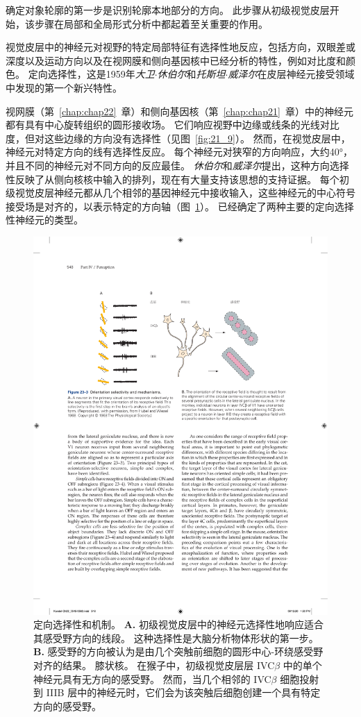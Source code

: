 确定对象轮廓的第一步是识别轮廓本地部分的方向。
此步骤从初级视觉皮层开始，该步骤在局部和全局形式分析中都起着至关重要的作用。


视觉皮层中的神经元对视野的特定局部特征有选择性地反应，包括方向，双眼差或深度以及运动方向以及在视网膜和侧向基因核中已经分析的特性，例如对比度和颜色。 
定向选择性，这是1959年\textit{大卫$\cdot$休伯尔}和\textit{托斯坦$\cdot$威泽尔}在皮层神经元接受领域中发现的第一个新兴特性。


视网膜（第~\ref{chap:chap22}~章）和侧向基因核（第~\ref{chap:chap21}~章）中的神经元都有具有中心旋转组织的圆形接收场。
它们响应视野中边缘或线条的光线对比度，但对这些边缘的方向没有选择性（见图~\ref{fig:21_9}）。
然而，在视觉皮层中，神经元对特定方向的线有选择性反应。
每个神经元对狭窄的方向响应，大约40°，并且不同的神经元对不同方向的反应最佳。
\textit{休伯尔}和\textit{威泽尔}提出，这种方向选择性反映了从侧向核核中输入的排列，现在有大量支持该思想的支持证据。
每个初级视觉皮层神经元都从几个相邻的基因神经元中接收输入，这些神经元的中心符号接受场是对齐的，以表示特定的方向轴（图~\ref{fig:23_3}）。
已经确定了两种主要的定向选择性神经元的类型。


\begin{figure}[htbp]
	\centering
	\includegraphics[width=0.9\linewidth]{chap23/fig_23_3}
	\caption{定向选择性和机制。
		\textbf{A.} 初级视觉皮层中的神经元选择性地响应适合其感受野方向的线段。
		这种选择性是大脑分析物体形状的第一步\cite{hubel1968receptive}。
		\textbf{B.} 感受野的方向被认为是由几个突触前细胞的圆形中心-环绕感受野对齐的结果。 
		膝状核。
		在猴子中，初级视觉皮层层 IVC$\beta$ 中的单个神经元具有无方向的感受野。
		然而，当几个相邻的 IVC$\beta$ 细胞投射到 IIIB 层中的神经元时，它们会为该突触后细胞创建一个具有特定方向的感受野。}
	\label{fig:23_3}
\end{figure}


